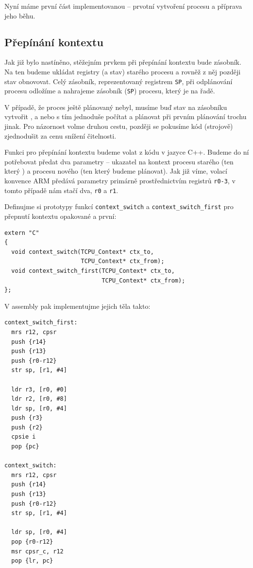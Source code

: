 \documentclass{article}
\begin{document}
Nyní máme první část implementovanou -- prvotní vytvoření procesu a příprava jeho běhu.

\subsection{Přepínání kontextu}

Jak již bylo nastíněno, stěžejním prvkem při přepínání kontextu bude zásobník. Na ten budeme ukládat registry (a stav) starého procesu a rovněž z něj později stav obnovovat. Celý zásobník, reprezentovaný registrem \texttt{SP}, při odplánování procesu odložíme a nahrajeme zásobník (\texttt{SP}) procesu, který je na řadě.

V případě, že proces ještě plánovaný nebyl, musíme buď stav na zásobníku vytvořit , a nebo s tím jednoduše počítat a plánovat při prvním plánování trochu jinak. Pro názornost volme druhou cestu, později se pokusíme kód (strojově) zjednodušit za cenu snížení čitelnosti.

Funkci pro přepínání kontextu budeme volat z kódu v jazyce C++. Budeme do ní potřebovat předat dva parametry -- ukazatel na kontext procesu starého (ten který ) a procesu nového (ten který budeme plánovat). Jak již víme, volací konvence ARM předává parametry primárně prostřednictvím registrů \texttt{r0-3}, v tomto případě nám stačí dva, \texttt{r0} a \texttt{r1}.

Definujme si prototypy funkcí \texttt{context\_switch} a \texttt{context\_switch\_first} pro přepnutí kontextu opakované a první:
\begin{lstlisting}
extern "C"
{
  void context_switch(TCPU_Context* ctx_to,
                      TCPU_Context* ctx_from);
  void context_switch_first(TCPU_Context* ctx_to,
                            TCPU_Context* ctx_from);
};
\end{lstlisting}
V assembly pak implementujme jejich těla takto:
\begin{lstlisting}
context_switch_first:
  mrs r12, cpsr
  push {r14}
  push {r13}
  push {r0-r12}
  str sp, [r1, #4]

  ldr r3, [r0, #0]
  ldr r2, [r0, #8]
  ldr sp, [r0, #4]
  push {r3}
  push {r2}
  cpsie i
  pop {pc}
  
context_switch:
  mrs r12, cpsr
  push {r14}
  push {r13}
  push {r0-r12}
  str sp, [r1, #4]

  ldr sp, [r0, #4]
  pop {r0-r12}
  msr cpsr_c, r12
  pop {lr, pc}
\end{lstlisting}
\end{document}
